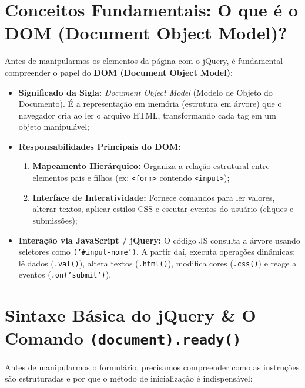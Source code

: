 
\section{Conceitos Fundamentais: O que é o DOM (Document Object Model)?}\label{sec:m1a}

Antes de manipularmos os elementos da página com o jQuery, é fundamental compreender o papel do \textbf{DOM (Document Object Model)}:

\begin{itemize}
\item \textbf{Significado da Sigla:} \textit{Document Object Model} (Modelo de Objeto do Documento). É a representação em memória (estrutura em árvore) que o navegador cria ao ler o arquivo HTML, transformando cada tag em um objeto manipulável;
\item \textbf{Responsabilidades Principais do DOM:} 
  \begin{enumerate}
    \item \textbf{Mapeamento Hierárquico:} Organiza a relação estrutural entre elementos pais e filhos (ex: \texttt{<form>} contendo \texttt{<input>});
    \item \textbf{Interface de Interatividade:} Fornece comandos para ler valores, alterar textos, aplicar estilos CSS e escutar eventos do usuário (cliques e submissões);
  \end{enumerate}
\item \textbf{Interação via JavaScript / jQuery:} O código JS consulta a árvore usando seletores como \texttt{\textdollar('\#input-nome')}. A partir daí, executa operações dinâmicas: lê dados (\texttt{.val()}), altera textos (\texttt{.html()}), modifica cores (\texttt{.css()}) e reage a eventos (\texttt{.on('submit')}).
\end{itemize}

\section{Sintaxe Básica do jQuery \& O Comando \texttt{\textdollar(document).ready()}}\label{sec:m1b}

Antes de manipularmos o formulário, precisamos compreender como as instruções são estruturadas e por que o método de inicialização é indispensável:

